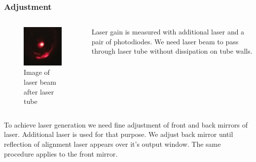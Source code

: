 \documentclass{beamer}
\begin{document}
	\begin{frame}
		\frametitle{Adjustment}
		\begin{columns}
			\begin{figure}
				\includegraphics[width=4cm]{data/beam.jpg}
				\caption{Image of laser beam after laser tube}
			\end{figure}
			Laser gain is measured with additional laser and a pair of photodiodes. We need laser beam to pass through laser tube without dissipation on tube walls.
		\end{columns}
		
		To achieve laser generation we need fine adjustment of front and back mirrors of laser. Additional laser is used for that purpose. We adjust back mirror until reflection of alignment laser appears over it's output window. The same procedure applies to the front mirror.
	\end{frame}
	
\end{document}
